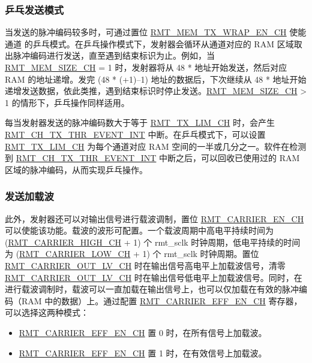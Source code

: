 \documentclass[main\_\_CN.tex]{subfiles}
\begin{document}
\subsubsection{乒乓发送模式}\label{sec:wrap-tx-mode}

当发送的脉冲编码较多时，可通过置位 \hyperref[fielddesc:RMTMEMTXWRAPENCHN]{RMT\_MEM\_TX\_WRAP\_EN\_CH} 使能通道  的乒乓模式。在乒乓操作模式下，发射器会循环从通道对应的 RAM 区域取出脉冲编码进行发送，直至遇到结束标识为止。例如，当 \hyperref[fielddesc:RMTMEMSIZECHN]{RMT\_MEM\_SIZE\_CH} = 1 时，发射器将从 48 *  地址开始发送，然后对应 RAM 的地址递增。发完 (48 * (+1)$–$1) 地址的数据后，下次继续从 48 *  地址开始递增发送数据，依此类推，遇到结束标识时停止发送。\hyperref[fielddesc:RMTMEMSIZECHN]{RMT\_MEM\_SIZE\_CH} > 1 的情形下，乒乓操作同样适用。

每当发射器发送的脉冲编码数大于等于 \hyperref[fielddesc:RMTTXLIMCHN]{RMT\_TX\_LIM\_CH} 时，会产生 \hyperref[int:RMTCHNTXTHREVENTINT]{RMT\_CH\_TX\_THR\_EVENT\_INT} 中断。在乒乓模式下，可以设置 \hyperref[fielddesc:RMTTXLIMCHN]{RMT\_TX\_LIM\_CH} 为每个通道对应 RAM 空间的一半或几分之一。软件在检测到 \hyperref[int:RMTCHNTXTHREVENTINT]{RMT\_CH\_TX\_THR\_EVENT\_INT} 中断之后，可以回收已使用过的 RAM 区域的脉冲编码，从而实现乒乓操作。


\subsubsection{发送加载波}

此外，发射器还可以对输出信号进行载波调制，置位 \hyperref[fielddesc:RMTCARRIERENCHN]{RMT\_CARRIER\_EN\_CH} 可以使能该功能。载波的波形可配置。一个载波周期中高电平持续时间为 (\hyperref[fielddesc:RMTCARRIERHIGHCHN]{RMT\_CARRIER\_HIGH\_CH} + 1) 个 rmt\_sclk 时钟周期，低电平持续的时间为 (\hyperref[fielddesc:RMTCARRIERLOWCHN]{RMT\_CARRIER\_LOW\_CH} + 1) 个 rmt\_sclk 时钟周期。置位 \hyperref[fielddesc:RMTCARRIEROUTLVCHN]{RMT\_CARRIER\_OUT\_LV\_CH} 时在输出信号高电平上加载波信号，清零 \hyperref[fielddesc:RMTCARRIEROUTLVCHN]{RMT\_CARRIER\_OUT\_LV\_CH} 时在输出信号低电平上加载波信号。同时，在进行载波调制时，载波可以一直加载在输出信号上，也可以仅加载在有效的脉冲编码（RAM 中的数据）上。通过配置 \hyperref[fielddesc:RMTCARRIEREFFENCHN]{RMT\_CARRIER\_EFF\_EN\_CH} 寄存器，可以选择这两种模式：
\begin{itemize}
    \item \hyperref[fielddesc:RMTCARRIEREFFENCHN]{RMT\_CARRIER\_EFF\_EN\_CH} 置 0 时，在所有信号上加载波。
    \item \hyperref[fielddesc:RMTCARRIEREFFENCHN]{RMT\_CARRIER\_EFF\_EN\_CH} 置 1 时，在有效信号上加载波。
\end{itemize}
\end{document}
